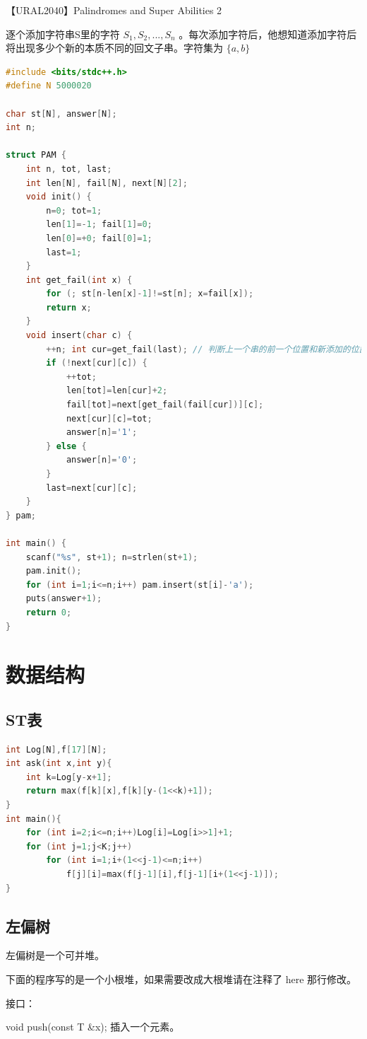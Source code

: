 \documentclass{article}
\begin{document}
【URAL2040】Palindromes and Super Abilities 2

逐个添加字符串S里的字符 $S_1, S_2, ..., S_n$ 。每次添加字符后，他想知道添加字符后将出现多少个新的本质不同的回文子串。字符集为 $\{a, b\}$

\begin{lstlisting}[language=C++]
#include <bits/stdc++.h>
#define N 5000020

char st[N], answer[N];
int n;
 
struct PAM {
	int n, tot, last;
	int len[N], fail[N], next[N][2];
	void init() {
		n=0; tot=1;
		len[1]=-1; fail[1]=0;
		len[0]=+0; fail[0]=1;
		last=1;
	}
	int get_fail(int x) {
		for (; st[n-len[x]-1]!=st[n]; x=fail[x]);
		return x;
	}
	void insert(char c) {
		++n; int cur=get_fail(last); // 判断上一个串的前一个位置和新添加的位置是否相同，相同则说明构成回文。否则找 fail 指针。
		if (!next[cur][c]) {
			++tot;
			len[tot]=len[cur]+2;
			fail[tot]=next[get_fail(fail[cur])][c];
			next[cur][c]=tot;
			answer[n]='1';
		} else {
			answer[n]='0';
		}
		last=next[cur][c];
	}
} pam;
 
int main() {
	scanf("%s", st+1); n=strlen(st+1);
	pam.init();
	for (int i=1;i<=n;i++) pam.insert(st[i]-'a');
	puts(answer+1);
	return 0;
}
\end{lstlisting}

\section{数据结构}
\subsection{ST表}
\begin{lstlisting}[language=C++]
int Log[N],f[17][N];
int ask(int x,int y){
	int k=Log[y-x+1];
	return max(f[k][x],f[k][y-(1<<k)+1]);
}
int main(){
	for (int i=2;i<=n;i++)Log[i]=Log[i>>1]+1;
	for (int j=1;j<K;j++)
		for (int i=1;i+(1<<j-1)<=n;i++)
			f[j][i]=max(f[j-1][i],f[j-1][i+(1<<j-1)]);
}
\end{lstlisting}
\subsection{左偏树}

左偏树是一个可并堆。

下面的程序写的是一个小根堆，如果需要改成大根堆请在注释了 here 那行修改。

接口：

void push(const T \&x); 插入一个元素。
\end{document}
